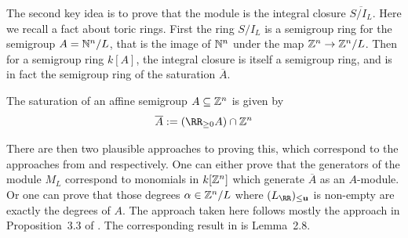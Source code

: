 \documentclass{amsart}
\begin{document}
The second key idea is to prove that the module is the integral closure $\overline{S/I_L}$. Here we recall a fact about toric rings. First the ring $S/I_L$ is a semigroup ring for the semigroup $A=\mathbb N^n/L$, that is the image of $\mathbb N^n$ under the map $\mathbb Z^n \rightarrow \mathbb Z^n/L$. Then for a semigroup ring $k[A]$, the integral closure is itself a semigroup ring, and is in fact the semigroup ring of the saturation $\overline{A}$.

The saturation of an affine semigroup $A\subseteq \mathbb Z^n$ is given by
\[\overline{A} := (\RR_{\geq 0}A)\cap \ZZ^n \]

There are then two plausible approaches to proving this, which correspond to the approaches from \cite{BCS+25} and \cite{BH25} respectively. One can either prove that the generators of the module $M_L$ correspond to monomials in $k[\mathbb Z^n]$ which generate $\overline{A}$ as an $A$-module. Or one can prove that those degrees $\alpha\in \mathbb Z^n/L$ where $(L_{\RR})_{\leq \mathbf{u}}$ is non-empty are exactly the degrees of $A$. The approach taken here follows mostly the approach in Proposition~3.3 of \cite{BCS+25}. The corresponding result in \cite{BH25} is Lemma~2.8.
\end{document}
